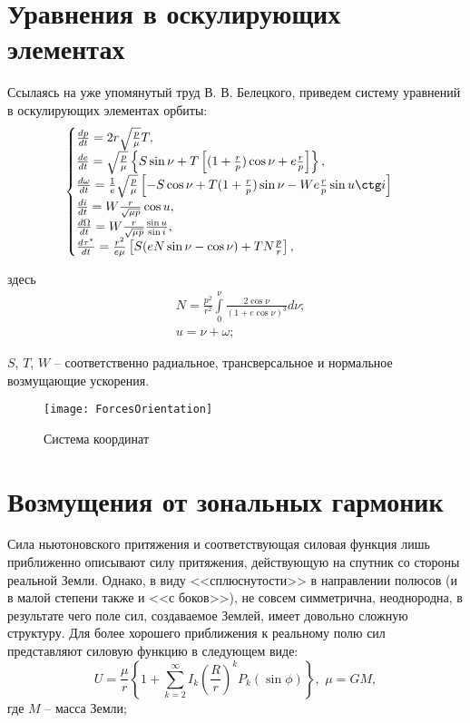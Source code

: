 \section{Уравнения в оскулирующих элементах}
\noindent\indent Ссылаясь на уже упомянутый труд В. В. Белецкого, приведем систему уравнений
в оскулирующих элементах орбиты:
\begin{equation}\label{eq:OsculirDynamic}
  \begin{cases}
    \frac{dp}{dt} = 2r\sqrt{\frac{p}{\mu}}T, \\
    \frac{de}{dt} = \sqrt{\frac{p}{\mu}}\left\{
      S\sin\nu + T\left[(1 + \frac{r}{p})\cos\nu + e\frac{r}{p}\right]
    \right\}, \\
    \frac{d\omega}{dt} = \frac{1}{e}\sqrt{\frac{p}{\mu}}\left[
      -S\cos\nu + T(1 + \frac{r}{p})\sin\nu - W e\frac{r}{p}\sin u\ctg i
    \right] \\
    \frac{di}{dt} = W \frac{r}{\sqrt{\mu p}}\cos u, \\
    \frac{d\Omega}{dt} = W \frac{r}{\sqrt{\mu p}}\frac{\sin u}{\sin i}, \\
    \frac{d\tau^*}{dt} = \frac{r^2}{e\mu}\left[
      S (eN\sin\nu - \cos\nu) + T N\frac{p}{r}
    \right],
  \end{cases}
\end{equation}\par
\noindent здесь
\begin{equation}
    \begin{aligned}
    &N = \frac{p^2}{r^2}\int\limits_0^{\nu} \frac{2\cos\nu}{(1 + e\cos\nu)^3}d\nu;\\
    &u = \nu + \omega;
    \end{aligned}
\end{equation}\par
$S$, $T$, $W$ -- соответственно радиальное, трансверсальное и нормальное возмущающие
ускорения.\par
\begin{figure}[h]
  \centering
  \texttt{[image: ForcesOrientation]}
  \caption{Система координат}
  \label{fig:ForcesOrientation}
\end{figure}\par
\section{Возмущения от зональных гармоник}
\noindent\indent Сила ньютоновского притяжения и соответствующая силовая функция
лишь приближенно описывают силу притяжения, действующую на спутник со стороны
реальной Земли. Однако, в виду <<сплюснутости>> в направлении полюсов (и в малой
степени также и <<с боков>>), не совсем симметрична, неоднородна, в результате
чего поле сил, создаваемое Землей, имеет довольно сложную структуру. Для более
хорошего приближения к реальному полю сил представляют силовую функцию в следующем виде:
\begin{equation} \label{eq:UModifiy}
  U = \frac{\mu}{r}\left\{1 + \sum\limits_{k=2}^{\infty}I_k\left(\frac{R}{r}\right)^kP_k(\sin\phi)\right\},\,\,
  \mu = GM,
\end{equation}
где $M$ -- масса Земли;

